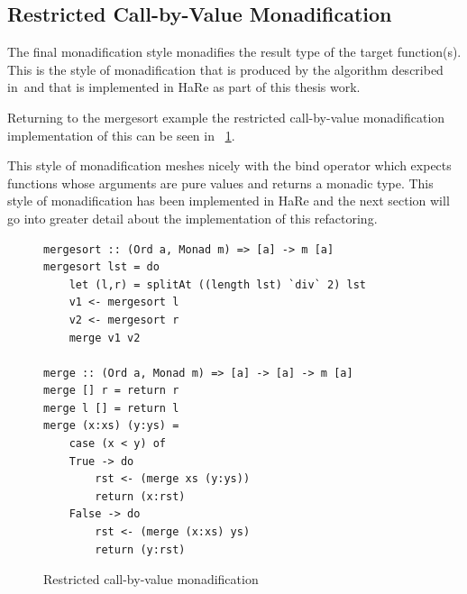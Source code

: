 \subsection{Restricted Call-by-Value Monadification}

The final monadification style \DIFdelbegin {}\DIFdelend monadifies the result type of the target function(s). This is the style of monadification that is produced by the algorithm described in~\DIFdelbegin {}\DIFdelend \DIFaddbegin {}\DIFaddend and that is implemented in HaRe as part of this thesis work.

Returning to the mergesort example \DIFdelbegin {}\DIFdelend \DIFaddbegin {}\DIFaddend the restricted call-by-value monadification implementation of this can be seen in \DIFdelbegin {}\DIFdelend \DIFaddbegin {}\DIFaddend ~\ref{rCBV}.

This style of monadification meshes nicely with the bind operator which expects functions whose arguments are pure values and returns a monadic type. This style of monadification has been implemented in HaRe and the next section will go into greater detail about the implementation of this refactoring.

\begin{figure}[t]
\begin{lstlisting}
mergesort :: (Ord a, Monad m) => [a] -> m [a]
mergesort lst = do
	let (l,r) = splitAt ((length lst) `div` 2) lst
	v1 <- mergesort l
	v2 <- mergesort r
	merge v1 v2

merge :: (Ord a, Monad m) => [a] -> [a] -> m [a]
merge [] r = return r
merge l [] = return l
merge (x:xs) (y:ys) = 
	case (x < y) of
	True -> do 
		rst <- (merge xs (y:ys)) 
		return (x:rst)
	False -> do
		rst <- (merge (x:xs) ys)	
	 	return (y:rst)
\end{lstlisting}
\caption{Restricted call-by-value monadification}
\label{rCBV}
\end{figure}

